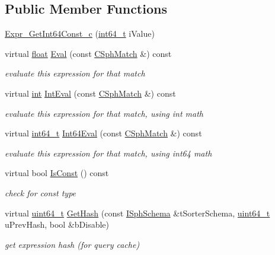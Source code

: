 \subsection*{Public Member Functions}
\begin{DoxyCompactItemize}
\item 
\hyperlink{structExpr__GetInt64Const__c_a74137c3f21c7e9ff1f3e864b8057c3d7}{Expr\-\_\-\-Get\-Int64\-Const\-\_\-c} (\hyperlink{sphinxstd_8h_a996e72f71b11a5bb8b3b7b6936b1516d}{int64\-\_\-t} i\-Value)
\item 
virtual \hyperlink{sphinxexpr_8cpp_a0e0d0739f7035f18f949c2db2c6759ec}{float} \hyperlink{structExpr__GetInt64Const__c_abaabd37bb8fd1247a877a7d52eba62cb}{Eval} (const \hyperlink{classCSphMatch}{C\-Sph\-Match} \&) const 
\begin{DoxyCompactList}\small\item\em evaluate this expression for that match \end{DoxyCompactList}\item 
virtual \hyperlink{sphinxexpr_8cpp_a4a26e8f9cb8b736e0c4cbf4d16de985e}{int} \hyperlink{structExpr__GetInt64Const__c_a2aa4c7589e338e56763bb2011f7f0f63}{Int\-Eval} (const \hyperlink{classCSphMatch}{C\-Sph\-Match} \&) const 
\begin{DoxyCompactList}\small\item\em evaluate this expression for that match, using int math \end{DoxyCompactList}\item 
virtual \hyperlink{sphinxstd_8h_a996e72f71b11a5bb8b3b7b6936b1516d}{int64\-\_\-t} \hyperlink{structExpr__GetInt64Const__c_ad330dee025977e3c782a138db5c1e242}{Int64\-Eval} (const \hyperlink{classCSphMatch}{C\-Sph\-Match} \&) const 
\begin{DoxyCompactList}\small\item\em evaluate this expression for that match, using int64 math \end{DoxyCompactList}\item 
virtual bool \hyperlink{structExpr__GetInt64Const__c_a6fe888d2c5345c74130e3ed684b204a5}{Is\-Const} () const 
\begin{DoxyCompactList}\small\item\em check for const type \end{DoxyCompactList}\item 
virtual \hyperlink{sphinxstd_8h_aaa5d1cd013383c889537491c3cfd9aad}{uint64\-\_\-t} \hyperlink{structExpr__GetInt64Const__c_afa08acb29de061d69322ea550d870993}{Get\-Hash} (const \hyperlink{classISphSchema}{I\-Sph\-Schema} \&t\-Sorter\-Schema, \hyperlink{sphinxstd_8h_aaa5d1cd013383c889537491c3cfd9aad}{uint64\-\_\-t} u\-Prev\-Hash, bool \&b\-Disable)
\begin{DoxyCompactList}\small\item\em get expression hash (for query cache) \end{DoxyCompactList}\end{DoxyCompactItemize}
